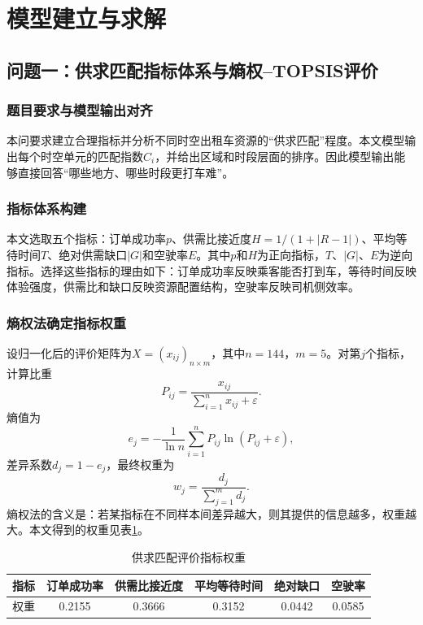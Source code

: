 \documentclass[12pt,a4paper]{ctexart}
\begin{document}
\section{模型建立与求解}
\subsection{问题一：供求匹配指标体系与熵权--TOPSIS评价}
\subsubsection{题目要求与模型输出对齐}
本问要求建立合理指标并分析不同时空出租车资源的“供求匹配”程度。本文模型输出每个时空单元的匹配指数$C_i$，并给出区域和时段层面的排序。因此模型输出能够直接回答“哪些地方、哪些时段更打车难”。

\subsubsection{指标体系构建}
本文选取五个指标：订单成功率$p$、供需比接近度$H=1/(1+|R-1|)$、平均等待时间$T$、绝对供需缺口$|G|$和空驶率$E$。其中$p$和$H$为正向指标，$T$、$|G|$、$E$为逆向指标。选择这些指标的理由如下：订单成功率反映乘客能否打到车，等待时间反映体验强度，供需比和缺口反映资源配置结构，空驶率反映司机侧效率。

\subsubsection{熵权法确定指标权重}
设归一化后的评价矩阵为$X=(x_{ij})_{n\times m}$，其中$n=144$，$m=5$。对第$j$个指标，计算比重
\begin{equation}
P_{ij}=\frac{x_{ij}}{\sum_{i=1}^{n}x_{ij}+\varepsilon}.
\end{equation}
熵值为
\begin{equation}
 e_j=-\frac{1}{\ln n}\sum_{i=1}^{n}P_{ij}\ln(P_{ij}+\varepsilon),
\end{equation}
差异系数$d_j=1-e_j$，最终权重为
\begin{equation}
 w_j=\frac{d_j}{\sum_{j=1}^{m}d_j}.
\end{equation}
熵权法的含义是：若某指标在不同样本间差异越大，则其提供的信息越多，权重越大。本文得到的权重见表\ref{tab:weights}。

\begin{table}[H]
\centering
\caption{供求匹配评价指标权重}
\label{tab:weights}
\begin{tabular}{lccccc}
\toprule
指标 & 订单成功率 & 供需比接近度 & 平均等待时间 & 绝对缺口 & 空驶率\\
\midrule
权重 & 0.2155 & 0.3666 & 0.3152 & 0.0442 & 0.0585\\
\bottomrule
\end{tabular}
\end{table}
\end{document}
